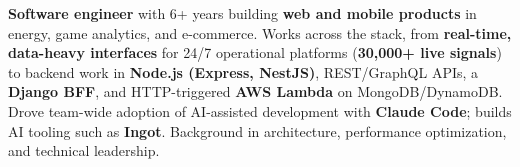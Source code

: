 
\begin{cvparagraph}

\textbf{Software engineer} with 6+ years building \textbf{web and mobile products} in energy, game analytics, and e-commerce. Works across the stack, from \textbf{real-time, data-heavy interfaces} for 24/7 operational platforms (\textbf{30,000+ live signals}) to backend work in \textbf{Node.js (Express, NestJS)}, REST/GraphQL APIs, a \textbf{Django BFF}, and HTTP-triggered \textbf{AWS Lambda} on MongoDB/DynamoDB. Drove team-wide adoption of AI-assisted development with \textbf{Claude Code}; builds AI tooling such as \textbf{Ingot}. Background in architecture, performance optimization, and technical leadership.

\end{cvparagraph}
